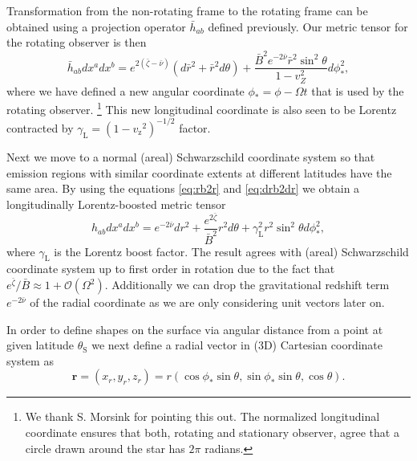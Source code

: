 \documentclass[iop, usenatbib]{emulateapj}
\newcommand{\be}{\begin{equation}}
\newcommand{\ee}{\end{equation}}
\renewcommand{\vec}[1]{\ensuremath{\boldsymbol{#1}}​}
\newcommand{\sch}{Schwarzschild }
\newcommand{\rb}{\ensuremath{\bar{r}}}
\newcommand{\nub}{\ensuremath{\bar{\nu}}}
\newcommand{\zetab}{\ensuremath{\bar{\zeta}}}
\newcommand{\Bb}{\ensuremath{\bar{B}}}
\newcommand{\vz}{\ensuremath{v_{\mathrm{z}}}}
\newcommand{\lgamma}{\gamma_{\text{L}}}
\begin{document}
Transformation from the non-rotating frame to the rotating frame can be obtained using a projection operator $\bar{h}_{ab}$ defined previously.
Our metric tensor for the rotating observer is then
\be
\bar{h}_{ab} dx^a dx^b = e^{2(\zetab - \nub)} (d\rb^2 + \rb^2 d\theta) + \frac{\Bb^2 e^{-2\nub} \rb^2 \sin^2\theta}{1-v_Z^2} d\phi_*^2,
\ee
where we have defined a new angular coordinate $\phi_* = \phi - \Omega t$ that is used by the rotating observer.%
\footnote{We thank S. Morsink for pointing this out. 
The normalized longitudinal coordinate ensures that both, rotating and stationary observer, agree that a circle drawn around the star has $2\pi$ radians.}
This new longitudinal coordinate is also seen to be Lorentz contracted by $\gamma_\mathrm{L} = (1-\vz^2)^{-1/2}$ factor.

Next we move to a normal (areal) \sch coordinate system so that emission regions with similar coordinate extents at different latitudes have the same area.
By using the equations \eqref{eq:rb2r} and \eqref{eq:drb2dr} we obtain a longitudinally Lorentz-boosted metric tensor 
\be \label{eq:gammaSch} 
h_{ab} dx^a dx^b = e^{-2\nub}dr^2 + \frac{e^{2\zetab}}{\Bb^2} r^2 d\theta + \lgamma^2 r^2 \sin^2\theta d\phi_*^2, 
\ee 
where $\gamma_\text{L}$ is the Lorentz boost factor.
The result agrees with (areal) \sch coordinate system up to first order in rotation due to the fact that $e^{\zetab}/\Bb \approx 1 + \mathcal{O}(\Omega^2)$.  
Additionally we can drop the gravitational redshift term $e^{-2\nub}$ of the radial coordinate as we are only considering unit vectors later on.

In order to define shapes on the surface via angular distance from a point at given latitude $\theta_{\mathrm{S}}$ we next define a radial vector in (3D) Cartesian coordinate system as 
\be
\vec{r} = (x_r, y_r, z_r) = r (\cos\phi_* \sin\theta, \sin\phi_* \sin\theta, \cos\theta).
\ee
\end{document}
